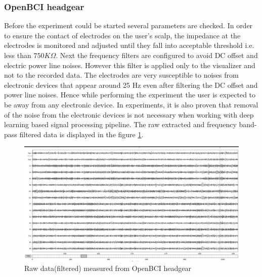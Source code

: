 \subsubsection{OpenBCI headgear}
Before the experiment could be started several parameters are checked. In order to ensure the contact of electrodes on the user's scalp, the impedance at the electrodes is monitored and adjusted until they fall into acceptable threshold i.e. less than $750K\Omega$. Next the frequency filters are configured to avoid DC offset and electric power line noises. However this filter is applied only to the visualizer and not to the recorded data. The electrodes are very susceptible to noises from electronic devices that appear around 25 Hz even after filtering the DC offset and power line noises. Hence while performing the experiment the user is expected to be away from any electronic device. In experiments, it is also proven that removal of the noise from the electronic devices is not necessary when working with deep learning based signal processing pipeline. The raw extracted and frequency band-pass filtered data is displayed in the figure \ref{fig:obci_rawfltrd}.

 \begin{figure}[H]
    \begin{center} 
    \includegraphics[height=0.6\textwidth]{images/obci_rawfltrd.png}
    \caption{Raw data(filtered) measured from OpenBCI headgear}
    \label{fig:obci_rawfltrd}
\end{center}
\end{figure}

